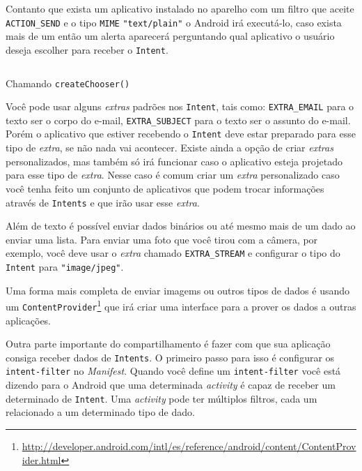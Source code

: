 \documentclass[a4paper,12pt,brazil]{book}
\begin{document}
\begin{singlespace}
		Contanto que exista um aplicativo instalado no aparelho com um filtro que aceite \texttt{ACTION\_SEND} e o tipo \texttt{MIME} \texttt{"text/plain"} o Android irá executá-lo, caso exista mais de um então um alerta aparecerá perguntando qual aplicativo o usuário deseja escolher para receber o \texttt{Intent}. 


		\begin{listing}[H]
		\inputminted[linenos=true,fontsize=\small,frame=lines, framesep=2mm, tabsize=2,numbersep=5pt]{java}{src/api/sharing/createchooser.java}
		\caption{Chamando \texttt{createChooser()}}
		\label{code:createchooser}
		\end{listing} 		

		Você pode usar alguns \emph{extras} padrões nos \texttt{Intent}, tais como: \texttt{EXTRA\_EMAIL} para o texto ser o corpo do e-mail, \texttt{EXTRA\_SUBJECT} para o texto ser o assunto do e-mail. Porém o aplicativo que estiver recebendo o \texttt{Intent} deve estar preparado para esse tipo de \emph{extra}, se não nada vai acontecer. Existe ainda a opção de criar \emph{extras} personalizados, mas também só irá funcionar caso o aplicativo esteja projetado para esse tipo de \emph{extra}. Nesse caso é comum criar um \emph{extra} personalizado caso você tenha feito um conjunto de aplicativos que podem trocar informações através de \texttt{Intents} e que irão usar esse \emph{extra}.

		Além de texto é possível enviar dados binários ou até mesmo mais de um dado ao enviar uma lista. Para enviar uma foto que você tirou com a câmera, por exemplo, você deve usar o \emph{extra} chamado \texttt{EXTRA\_STREAM} e configurar o tipo do \texttt{Intent} para \texttt{"image/jpeg"}.

		Uma forma mais completa de enviar imagems ou outros tipos de dados é usando um \texttt{ContentProvider}\footnote{\href{http://developer.android.com/intl/es/reference/android/content/ContentProvider.html}{http://developer.android.com/intl/es/reference/android/content/ContentProvider.html}} que irá criar uma interface para a prover os dados a outras aplicações.

		Outra parte importante do compartilhamento é fazer com que sua aplicação consiga receber dados de \texttt{Intents}. O primeiro passo para isso é configurar os \texttt{intent-filter} no \emph{Manifest}. Quando você define um \texttt{intent-filter} você está dizendo para o Android que uma determinada \emph{activity} é capaz de receber um determinado de \texttt{Intent}. Uma \emph{activity} pode ter múltiplos filtros, cada um relacionado a um determinado tipo de dado.


\end{singlespace}
\end{document}
